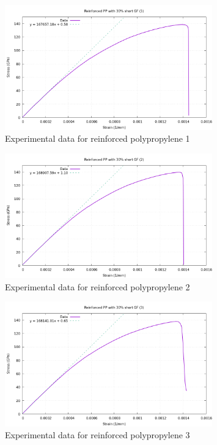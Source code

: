 \begin{figure}[h]
	\centering
	\includegraphics[width=0.8\textwidth]{img/reinf_PP1.png}
	\caption{Experimental data for reinforced polypropylene 1}
\end{figure}
\begin{figure}[h]
	\centering
	\includegraphics[width=0.8\textwidth]{img/reinf_PP2.png}
	\caption{Experimental data for reinforced polypropylene 2}
\end{figure}
\begin{figure}[h]
	\centering
	\includegraphics[width=0.8\textwidth]{img/reinf_PP3.png}
	\caption{Experimental data for reinforced polypropylene 3}
\end{figure}

